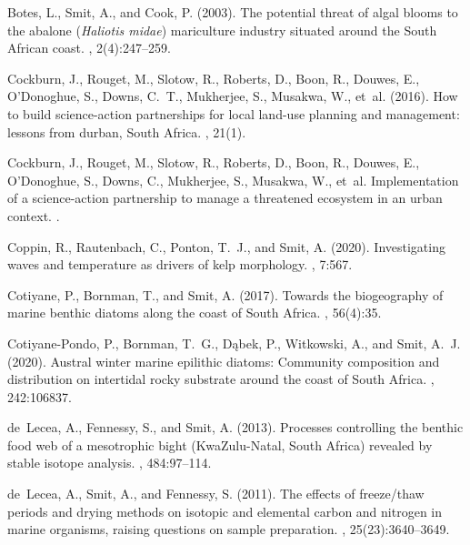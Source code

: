 \begin{thebibliography}{}
  Botes, L., Smit, A., and Cook, P. (2003).
  \newblock The potential threat of algal blooms to the abalone (\emph{Haliotis
    midae}) mariculture industry situated around the {S}outh {A}frican coast.
  , 2(4):247--259.
  
  Cockburn, J., Rouget, M., Slotow, R., Roberts, D., Boon, R., Douwes, E.,
    O'Donoghue, S., Downs, C.~T., Mukherjee, S., Musakwa, W., et~al. (2016).
  \newblock How to build science-action partnerships for local land-use planning
    and management: lessons from durban, {S}outh {A}frica.
  , 21(1).
  
  Cockburn, J., Rouget, M., Slotow, R., Roberts, D., Boon, R., Douwes, E.,
    O’Donoghue, S., Downs, C., Mukherjee, S., Musakwa, W., et~al.
  \newblock Implementation of a science-action partnership to manage a threatened
    ecosystem in an urban context.
  .
  
  Coppin, R., Rautenbach, C., Ponton, T.~J., and Smit, A. (2020).
  \newblock Investigating waves and temperature as drivers of kelp morphology.
  , 7:567.
  
  Cotiyane, P., Bornman, T., and Smit, A. (2017).
  \newblock Towards the biogeography of marine benthic diatoms along the coast of
    {S}outh {A}frica.
  , 56(4):35.
  
  Cotiyane-Pondo, P., Bornman, T.~G., D{\k{a}}bek, P., Witkowski, A., and Smit,
    A.~J. (2020).
  \newblock Austral winter marine epilithic diatoms: Community composition and
    distribution on intertidal rocky substrate around the coast of {S}outh
    {A}frica.
  , 242:106837.
  
  de~Lecea, A., Fennessy, S., and Smit, A. (2013).
  \newblock Processes controlling the benthic food web of a mesotrophic bight
    ({K}wa{Z}ulu-{N}atal, {S}outh {A}frica) revealed by stable isotope analysis.
  , 484:97--114.
  
  de~Lecea, A., Smit, A., and Fennessy, S. (2011).
  \newblock The effects of freeze/thaw periods and drying methods on isotopic and
    elemental carbon and nitrogen in marine organisms, raising questions on
    sample preparation.
  , 25(23):3640--3649.
  

\end{thebibliography}
